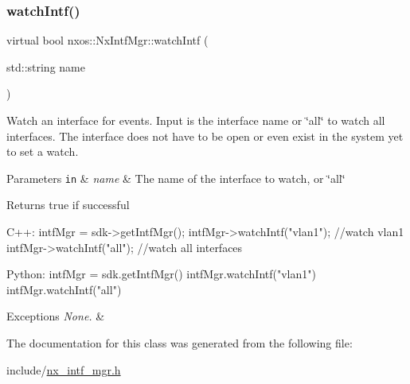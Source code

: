 \subsubsection{\texorpdfstring{watch\+Intf()}{watchIntf()}}
{\footnotesize\ttfamily virtual bool nxos\+::\+Nx\+Intf\+Mgr\+::watch\+Intf (\begin{DoxyParamCaption}\item[{std\+::string}]{name }\end{DoxyParamCaption})\hspace{0.3cm}{\ttfamily [pure virtual]}}

Watch an interface for events. Input is the interface name or \char`\"{}all\char`\"{} to watch all interfaces. The interface does not have to be open or even exist in the system yet to set a watch. 
\begin{DoxyParams}[1]{Parameters}
\mbox{\tt in}  & {\em name} & The name of the interface to watch, or \char`\"{}all\char`\"{} \\
\hline
\end{DoxyParams}
\begin{DoxyReturn}{Returns}
true if successful
\end{DoxyReturn}

\begin{DoxyCode}
C++:
      intfMgr = sdk->getIntfMgr();
      intfMgr->watchIntf(\textcolor{stringliteral}{"vlan1"});  \textcolor{comment}{//watch vlan1}
      intfMgr->watchIntf(\textcolor{stringliteral}{"all"});   \textcolor{comment}{//watch all interfaces}

Python:
      intfMgr = sdk.getIntfMgr()
      intfMgr.watchIntf(\textcolor{stringliteral}{"vlan1"}) 
      intfMgr.watchIntf(\textcolor{stringliteral}{"all"})
\end{DoxyCode}



\begin{DoxyExceptions}{Exceptions}
{\em None.} & \\
\hline
\end{DoxyExceptions}


The documentation for this class was generated from the following file\+:\begin{DoxyCompactItemize}
\item 
include/\mbox{\hyperlink{nx__intf__mgr_8h}{nx\+\_\+intf\+\_\+mgr.\+h}}\end{DoxyCompactItemize}
